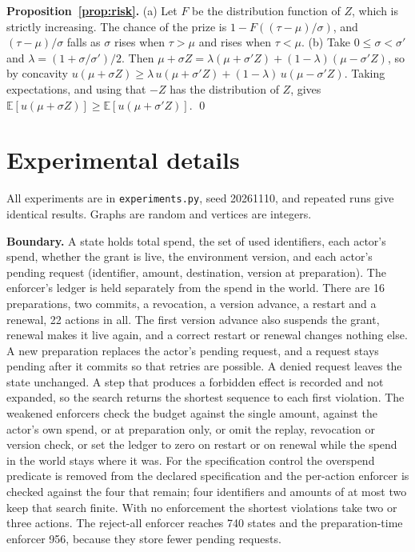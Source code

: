 \documentclass[10pt,twocolumn,letterpaper]{article}
\theoremstyle{definition}
\newcommand{\Ex}{\mathbb{E}}
\newcommand{\para}[1]{\smallskip\noindent\textbf{#1}\enspace}
\newcommand{\BndRejectStates}{740}
\newcommand{\BndPrepStates}{956}
\begin{document}
\textbf{Proposition~\ref{prop:risk}.} (a) Let $F$ be the distribution function of $Z$, which is strictly increasing. The chance of the prize is $1-F((\tau-\mu)/\sigma)$, and $(\tau-\mu)/\sigma$ falls as $\sigma$ rises when $\tau>\mu$ and rises when $\tau<\mu$. (b) Take $0\le\sigma<\sigma'$ and $\lambda=(1+\sigma/\sigma')/2$. Then $\mu+\sigma Z=\lambda(\mu+\sigma' Z)+(1-\lambda)(\mu-\sigma' Z)$, so by concavity $u(\mu+\sigma Z)\ge\lambda\,u(\mu+\sigma' Z)+(1-\lambda)\,u(\mu-\sigma' Z)$. Taking expectations, and using that $-Z$ has the distribution of $Z$, gives $\Ex[u(\mu+\sigma Z)]\ge\Ex[u(\mu+\sigma' Z)]$. \qed

\section{Experimental details}
\label{app:exp}

All experiments are in \texttt{experiments.py}, seed 20261110, and repeated runs give identical results. Graphs are random and vertices are integers.

\para{Boundary.} A state holds total spend, the set of used identifiers, each actor's spend, whether the grant is live, the environment version, and each actor's pending request (identifier, amount, destination, version at preparation). The enforcer's ledger is held separately from the spend in the world. There are 16 preparations, two commits, a revocation, a version advance, a restart and a renewal, 22 actions in all. The first version advance also suspends the grant, renewal makes it live again, and a correct restart or renewal changes nothing else. A new preparation replaces the actor's pending request, and a request stays pending after it commits so that retries are possible. A denied request leaves the state unchanged. A step that produces a forbidden effect is recorded and not expanded, so the search returns the shortest sequence to each first violation. The weakened enforcers check the budget against the single amount, against the actor's own spend, or at preparation only, or omit the replay, revocation or version check, or set the ledger to zero on restart or on renewal while the spend in the world stays where it was. For the specification control the overspend predicate is removed from the declared specification and the per-action enforcer is checked against the four that remain; four identifiers and amounts of at most two keep that search finite. With no enforcement the shortest violations take two or three actions. The reject-all enforcer reaches \BndRejectStates{} states and the preparation-time enforcer \BndPrepStates, because they store fewer pending requests.
\end{document}
